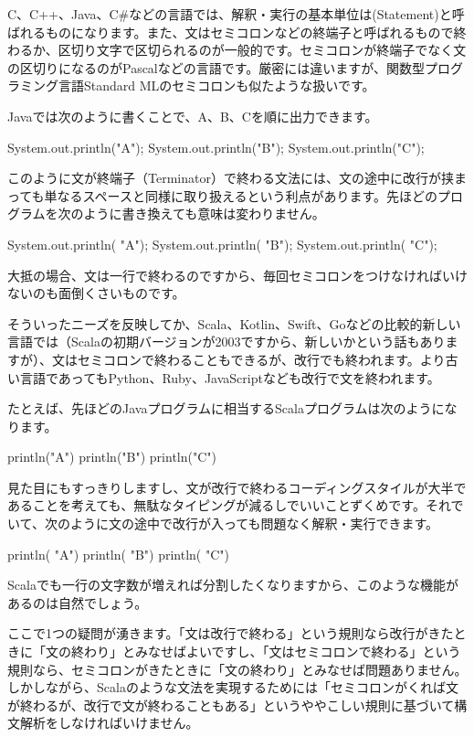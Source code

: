 C、C++、Java、C\#などの言語では、解釈・実行の基本単位は(Statement)と呼ばれるものになります。また、文はセミコロンなどの終端子と呼ばれるもので終わるか、区切り文字で区切られるのが一般的です。セミコロンが終端子でなく文の区切りになるのがPascalなどの言語です。厳密には違いますが、関数型プログラミング言語Standard
MLのセミコロンも似たような扱いです。

Javaでは次のように書くことで、A、B、Cを順に出力できます。

\begin{codescreen}{}
System.out.println("A");
System.out.println("B");
System.out.println("C");
\end{codescreen}

このように文が終端子（Terminator）で終わる文法には、文の途中に改行が挟まっても単なるスペースと同様に取り扱えるという利点があります。先ほどのプログラムを次のように書き換えても意味は変わりません。

\begin{codescreen}{}
System.out.println(
  "A");
System.out.println(
  "B");
System.out.println(
  "C");
\end{codescreen}

大抵の場合、文は一行で終わるのですから、毎回セミコロンをつけなければいけないのも面倒くさいものです。

そういったニーズを反映してか、Scala、Kotlin、Swift、Goなどの比較的新しい言語では（Scalaの初期バージョンが2003ですから、新しいかという話もありますが）、文はセミコロンで終わることもできるが、改行でも終われます。より古い言語であってもPython、Ruby、JavaScriptなども改行で文を終われます。

たとえば、先ほどのJavaプログラムに相当するScalaプログラムは次のようになります。

\begin{codescreen}{}
println("A")
println("B")
println("C")
\end{codescreen}

見た目にもすっきりしますし、文が改行で終わるコーディングスタイルが大半であることを考えても、無駄なタイピングが減るしでいいことずくめです。それでいて、次のように文の途中で改行が入っても問題なく解釈・実行できます。

\begin{codescreen}{}
println(
  "A")
println(
  "B")
println(
  "C")
\end{codescreen}

Scalaでも一行の文字数が増えれば分割したくなりますから、このような機能があるのは自然でしょう。

ここで1つの疑問が湧きます。「文は改行で終わる」という規則なら改行がきたときに「文の終わり」とみなせばよいですし、「文はセミコロンで終わる」という規則なら、セミコロンがきたときに「文の終わり」とみなせば問題ありません。しかしながら、Scalaのような文法を実現するためには「セミコロンがくれば文が終わるが、改行で文が終わることもある」というややこしい規則に基づいて構文解析をしなければいけません。

